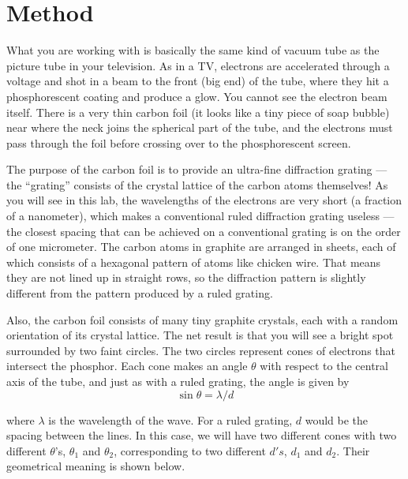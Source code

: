 \section*{Method}

What you are working with is basically the same kind of
vacuum tube as the picture tube in your television. As in a
TV, electrons are accelerated through a voltage and shot in
a beam to the front (big end) of the tube, where they hit a
phosphorescent coating and produce a glow. You cannot see
the electron beam itself. There is a very thin carbon foil
(it looks like a tiny piece of soap bubble) near where the
neck joins the spherical part of the tube, and the electrons
must pass through the foil before crossing over to the
phosphorescent screen.

The purpose of the carbon foil is to provide an ultra-fine
diffraction grating --- the ``grating'' consists of the
crystal lattice of the carbon atoms themselves! As you will
see in this lab, the wavelengths of the electrons are very
short (a fraction of a nanometer), which makes a conventional
ruled diffraction grating useless --- the closest spacing
that can be achieved on a conventional grating is on the
order of one micrometer. The carbon atoms in graphite are
arranged in sheets, each of which consists of a hexagonal
pattern of atoms like chicken wire. That means they are not
lined up in straight rows, so the diffraction pattern is
slightly different from the pattern produced by a ruled grating.

Also, the carbon foil consists of many tiny graphite
crystals, each with a random orientation of its crystal
lattice. The net result is that you will see a bright spot
surrounded by two faint circles. The two circles represent
cones of electrons that intersect the phosphor. Each cone
makes an angle $\theta $ with respect to the central axis of
the tube, and just as with a ruled grating, the angle is given by
\begin{equation*}
         \sin\theta   =  \lambda /d  
\end{equation*}

where $\lambda $ is the wavelength of the wave. For a ruled
grating, $d$ would be the spacing between the lines. In this
case, we will have two different cones with two different
$\theta $'s, $\theta_1$ and $\theta_2$, corresponding to two
different $d's$, $d_1$ and $d_2$. Their geometrical
meaning is shown below.



